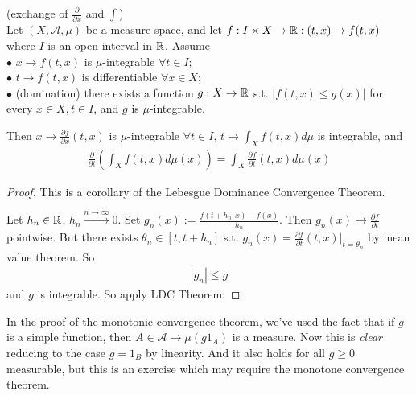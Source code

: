 \documentclass[a4paper]{article}
\begin{document}
\begin{coro} (exchange of $\frac{\partial}{\partial x}$ and $\int$)\\
Let $(X,\mathcal{A},\mu)$ be a measure space, and let $f:I \times X \to \mathbb{R}: (t,x) \to f(t,x)$ where $I$ is an open interval in $\mathbb{R}$. Assume\\
$\bullet$ $x \to f(t,x)$ is $\mu$-integrable $\forall t \in I$;\\
$\bullet$ $t \to f(t,x)$ is differentiable $\forall x \in X$;\\
$\bullet$ (domination) there exists a function $g:X \to \mathbb{R}$ s.t. $|f(t,x) \leq g(x)|$ for every $x\in X, t \in I$, and $g$ is $\mu$-integrable.

Then $x \to \frac{\partial f}{\partial x} (t,x)$ is $\mu$-integrable $\forall t \in I$, $t \to \int_X f(t,x) d\mu$ is integrable, and 
\begin{equation*}
\begin{aligned}
\frac{\partial}{\partial t} \left(\int_X f(t,x)d\mu(x)\right) = \int_X \frac{\partial f}{\partial t}(t,x) d\mu(x)
\end{aligned}
\end{equation*}
\begin{proof}
This is a corollary of the Lebesgue Dominance Convergence Theorem.

Let $h_n \in \mathbb{R}$, $h_n \xrightarrow{n \to \infty} 0$. Set $g_n(x) := \frac{f(t+h_n,x) - f(x)}{h_n}$. Then $g_n(x) \to \frac{\partial f}{\partial t}$ pointwise. But there exists $\theta_n \in [t,t+h_n]$ s.t. $g_n(x) = \frac{\partial f}{\partial t}(t,x)|_{t = \theta_n}$ by mean value theorem. So
\begin{equation*}
\begin{aligned}
|g_n| \leq g
\end{aligned}
\end{equation*}
and $g$ is integrable. So apply LDC Theorem.
\end{proof}
\end{coro}

In the proof of the monotonic convergence theorem, we've used the fact that if $g$ is a simple function, then $A \in \mathcal{A} \to \mu (g 1_A)$ is a measure. Now this is \emph{clear} reducing to the case $g=1_B$ by linearity. And it also holds for all $g \geq 0$ measurable, but this is an exercise which may require the monotone convergence theorem.
\end{document}
